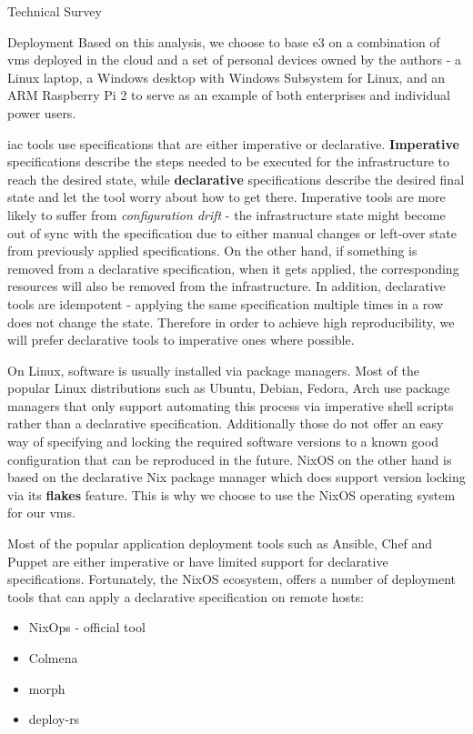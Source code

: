 \begin{frame}{Technical Survey}
\begin{block}{Deployment}
Based on this analysis, we choose to base \gls{e3} on a combination of
\glspl{vm} deployed in the cloud and a set of personal devices owned by
the authors - a Linux laptop, a Windows desktop with Windows Subsystem
for Linux, and an ARM Raspberry Pi 2 to serve as an example of both
enterprises and individual power users.

\gls{iac} tools use specifications that are either imperative or
declarative. \textbf{Imperative} specifications describe the steps
needed to be executed for the infrastructure to reach the desired state,
while \textbf{declarative} specifications describe the desired final
state and let the tool worry about how to get there. Imperative tools
are more likely to suffer from \emph{configuration drift} - the
infrastructure state might become out of sync with the specification due
to either manual changes or left-over state from previously applied
specifications. On the other hand, if something is removed from a
declarative specification, when it gets applied, the corresponding
resources will also be removed from the infrastructure. In addition,
declarative tools are idempotent - applying the same specification
multiple times in a row does not change the state. Therefore in order to
achieve high reproducibility, we will prefer declarative tools to
imperative ones where possible.

On Linux, software is usually installed via package managers. Most of
the popular Linux distributions such as Ubuntu, Debian, Fedora, Arch use
package managers that only support automating this process via
imperative shell scripts rather than a declarative specification.
Additionally those do not offer an easy way of specifying and locking
the required software versions to a known good configuration that can be
reproduced in the future. NixOS on the other hand is based on the
declarative Nix package manager which does support version locking via
its \textbf{flakes} feature. This is why we choose to use the NixOS
operating system for our \glspl{vm}.

Most of the popular application deployment tools such as Ansible, Chef
and Puppet are either imperative or have limited support for declarative
specifications. Fortunately, the NixOS ecosystem, offers a number of
deployment tools that can apply a declarative specification on remote
hosts:

\begin{itemize}
\tightlist
\item
  NixOps\autocite{nixopsSource,nixopsDocs} - official tool
\item
  Colmena \autocite{colmenaSource,colmenaDocs}
\item
  morph \autocite{morphSource}
\item
  deploy-rs \autocite{deployrsSource}
\end{itemize}


\end{block}
\end{frame}
